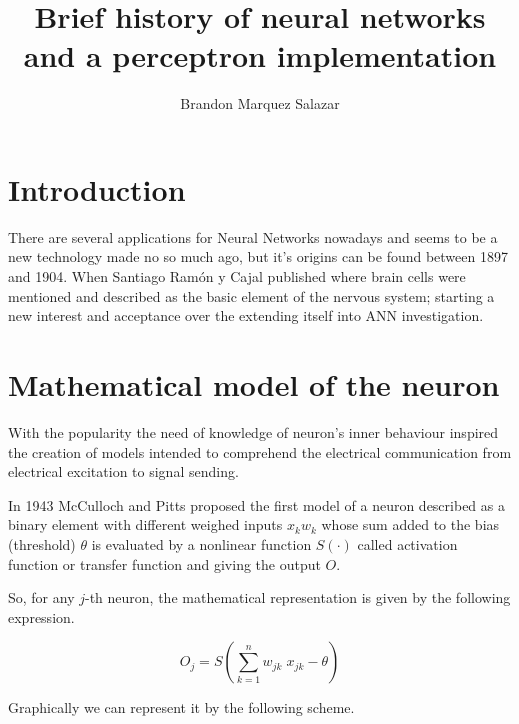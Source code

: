 \documentclass[10pt]{IEEEtran}
\title{Brief history of neural networks and a perceptron implementation}
\author{ Brandon Marquez Salazar }
\begin{document}
\maketitle

\section{Introduction}

There are several applications for Neural Networks nowadays and seems to
be a new technology made no so much ago, but it's origins can be found
between 1897 and 1904. When Santiago Ramón y Cajal published
where brain cells were mentioned and described as the basic element of the
nervous system; starting a new interest and acceptance over the
 extending itself into ANN investigation.


\section{Mathematical model of the neuron}

With the  popularity the need of knowledge of
neuron's inner behaviour inspired the creation of models intended to
comprehend the electrical communication from electrical excitation to
signal sending.

In 1943 McCulloch and Pitts \cite{MCCULLOCH199099} proposed the first
model of a neuron described as a binary element with different weighed
inputs $x_k w_k$ whose sum added to the bias (threshold) $\theta$ is
evaluated by a nonlinear function $S(\cdot)$ called activation function or
transfer function and giving the  output $O$.

So, for any $j$-th neuron, the
mathematical representation is given by the following expression.

\begin{equation}
  O_j=S\left( \sum_{k=1}^{n} w_{jk} \; x_{jk}-\theta \right)
\end{equation}

Graphically we can represent it by the following scheme.
\end{document}
